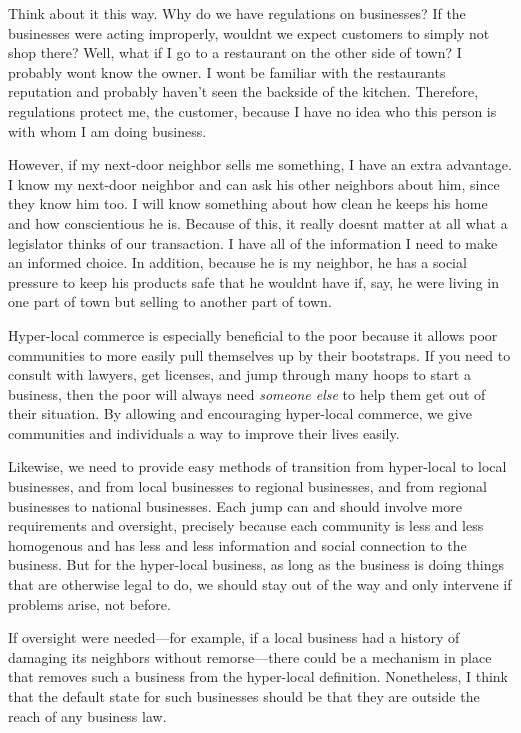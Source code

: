 Think about it this way. Why do we have regulations on businesses?  If
the businesses were acting improperly, wouldn{\textquotesingle}t we
expect customers to simply not shop there?  Well,
what if I go to a
restaurant on the other side of town? I probably won{\textquotesingle}t
know the owner. I won{\textquotesingle}t be familiar with the
restaurant{\textquotesingle}s reputation and probably haven’t seen the
backside of the kitchen. Therefore, regulations protect me, the
customer, because I have no idea who this person is with whom I am
doing business.

However, if my next-door neighbor sells me something, I have an extra
advantage. I know my next-door neighbor and can ask his other neighbors
about him, since they know him too. I will know something about how
clean he keeps his home and how conscientious he is. Because of this,
it really doesn{\textquotesingle}t matter at all what a legislator
thinks of our transaction. I have all of the information I need to make
an informed choice. In addition, because he is my neighbor, he has a
social pressure to keep his products safe that he
wouldn{\textquotesingle}t have if, say, he were living in one part of
town but selling to another part of town.

Hyper-local commerce
is especially beneficial to the poor because it allows poor communities
to more easily pull themselves up by their bootstraps. If you need to
consult with lawyers, get licenses, and jump through many hoops to
start a business, then the poor will always need \textit{someone else}
to help them get out of their situation. By allowing and encouraging
hyper-local commerce, we give communities and individuals a way to
improve their lives easily.

Likewise, we need to provide easy methods of transition from hyper-local
to local businesses, and from local businesses to regional businesses,
and from regional businesses to national businesses. Each jump can and
should involve more requirements and oversight, precisely because each
community is less and less homogenous and has less and less information
and social connection to the business. But for the hyper-local
business, as long as the business is doing things that are otherwise
legal to do, we should stay out of the way and only intervene if
problems arise, not before.

If oversight were
needed—for example, if a local business had a history of damaging its
neighbors without remorse—there could be a mechanism in place that
removes such a business from the hyper-local definition.  Nonetheless,
I think that the default state for such businesses should be that they
are outside the reach of any business law. 


